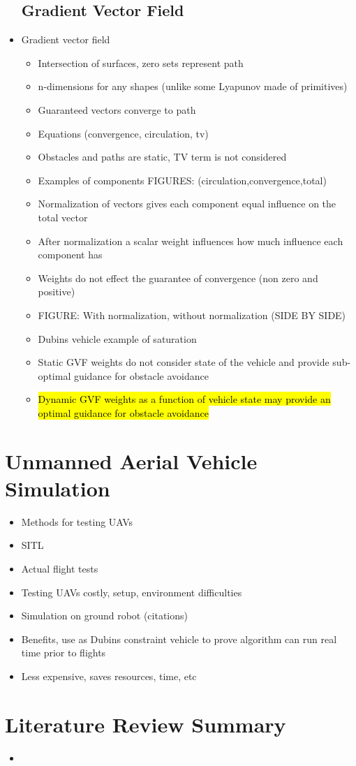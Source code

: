 \documentclass[numbered,pdftex]{ohio-etd}
\begin{document}
\begin{itemize}
	\subsection{Gradient Vector Field}
	\item Gradient vector field
	\begin{itemize}
		\item Intersection of surfaces, zero sets represent path
		\item n-dimensions for any shapes (unlike some Lyapunov made of primitives)
		\item Guaranteed vectors converge to path
		\item Equations (convergence, circulation, tv)
		\item Obstacles and paths are static, TV term is not considered
		\item Examples of components FIGURES: (circulation,convergence,total)
		\item Normalization of vectors gives each component equal influence on the total vector
		\item After normalization a scalar weight influences how much influence each component has
		\item Weights do not effect the guarantee of convergence (non zero and positive)
		\item FIGURE: With normalization, without normalization (SIDE BY SIDE)
		\item Dubins vehicle example of saturation
		\item Static GVF weights do not consider state of the vehicle and provide sub-optimal guidance for obstacle avoidance
		\item \hl{Dynamic GVF weights as a function of vehicle state may provide an optimal guidance for obstacle avoidance}
\end{itemize}
\end{itemize}


\section{Unmanned Aerial Vehicle Simulation}
\begin{itemize}
	\item Methods for testing UAVs
	\item SITL
	\item Actual flight tests
	\item Testing UAVs costly, setup, environment difficulties
	\item Simulation on ground robot (citations)
	\item Benefits, use as Dubins constraint vehicle to prove algorithm can run real time prior to flights
	\item Less expensive, saves resources, time, etc
\end{itemize}

\section{Literature Review Summary}

\begin{itemize}
	\item 
\end{itemize}

   

\end{document}
